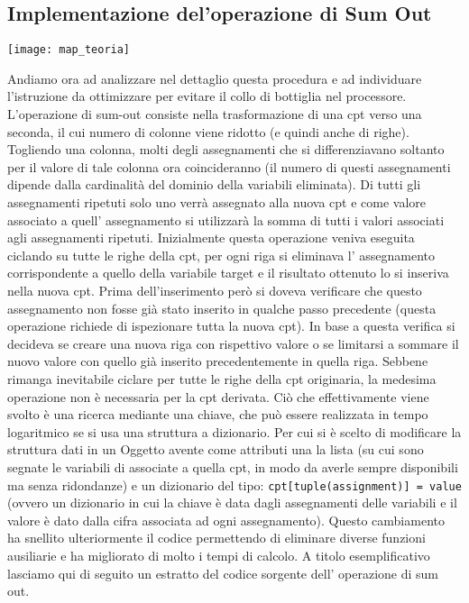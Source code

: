 \subsection{Implementazione del'operazione di  Sum Out}

\begin{minipage}{\linewidth}
	\centering
	\texttt{[image: map\_teoria]}
	\label{map_teoria} 
\end{minipage}

Andiamo ora ad analizzare nel dettaglio questa procedura e ad individuare l’istruzione da ottimizzare per evitare il collo di bottiglia nel processore. L’operazione di sum-out consiste nella trasformazione di una cpt verso una seconda, il cui numero di colonne viene ridotto (e quindi anche di righe). Togliendo una colonna, molti degli assegnamenti che si differenziavano soltanto per il valore di tale colonna ora coincideranno (il numero di questi assegnamenti dipende dalla cardinalità del dominio della variabili eliminata). Di tutti gli assegnamenti ripetuti solo uno verrà assegnato alla nuova cpt e come valore associato a quell' assegnamento si utilizzarà la somma di tutti i valori associati agli assegnamenti ripetuti. Inizialmente questa operazione veniva eseguita ciclando su tutte le righe della cpt, per ogni riga si eliminava l’ assegnamento corrispondente a quello della variabile target e il risultato ottenuto lo si inseriva nella nuova cpt. Prima dell’inserimento però si doveva verificare che questo assegnamento non fosse già stato inserito in qualche passo precedente (questa operazione richiede di ispezionare tutta la nuova cpt). In base a questa verifica si decideva se creare una nuova riga con rispettivo valore o se limitarsi a sommare il nuovo valore con quello già inserito precedentemente in quella riga. Sebbene rimanga inevitabile ciclare per tutte le righe della cpt originaria, la medesima operazione non è necessaria per la cpt derivata. Ciò che effettivamente viene svolto  è una ricerca mediante una chiave, che può essere realizzata in tempo logaritmico se si usa una struttura a dizionario. Per cui si è scelto di modificare la struttura dati in un Oggetto avente come attributi una la lista (su cui sono segnate le variabili di associate a quella cpt, in modo da averle sempre disponibili ma senza ridondanze) e un dizionario del tipo: \texttt{cpt[tuple(assignment)] = value} (ovvero un dizionario in cui la chiave è data dagli assegnamenti delle variabili e il valore è dato  dalla cifra associata ad ogni assegnamento). Questo cambiamento ha snellito ulteriormente il codice permettendo di eliminare diverse funzioni ausiliarie e ha migliorato di molto i tempi di calcolo. A titolo esemplificativo lasciamo qui di seguito un estratto del codice sorgente dell’ operazione di sum out.

